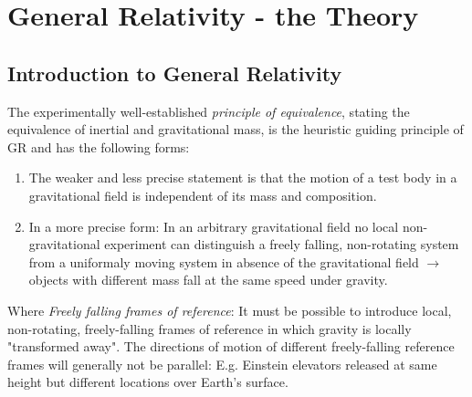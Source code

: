 \newpage

\chapter{General Relativity - the Theory}

\label{ch:GRtheory}
\section{Introduction to General Relativity}
The experimentally well-established \emph{principle of equivalence}, stating the equivalence of inertial and gravitational mass, is the heuristic guiding principle of GR and has the following forms:
\begin{enumerate}
	\item The weaker and less precise statement is that the motion of a test body in a gravitational field is independent of its mass and composition.
	\item In a more precise form: In an arbitrary gravitational field no local non-gravitational experiment can distinguish a freely falling, non-rotating system from a uniformaly moving system in absence of the gravitational field $\rightarrow$ objects with different mass fall at the same speed under gravity.
\end{enumerate}

Where \emph{Freely falling frames of reference}:
It must be possible to introduce local, non-rotating, freely-falling frames of reference in which gravity is locally "transformed away".
The directions of motion of different freely-falling reference frames will generally not be parallel: E.g. Einstein elevators released at same height but different locations over Earth's surface.
